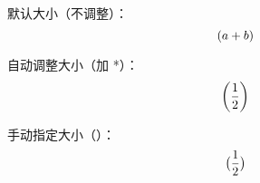 \documentclass{article}
\DeclarePairedDelimiter{\paren}{(}{)}
\begin{document}
默认大小（不调整）：
\[ \paren{a + b} \]

自动调整大小（加 *）：
\[ \paren*{\frac{1}{2}} \]

手动指定大小（\big）：
\[ \paren[\big]{\frac{1}{2}} \]
\end{document}
